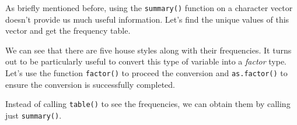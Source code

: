 \documentclass[
]{book}
\newenvironment{Shaded}{\begin{snugshade}}{\end{snugshade}}
\newcommand{\CommentTok}[1]{\textcolor[rgb]{0.56,0.35,0.01}{\textit{#1}}}
\newcommand{\FunctionTok}[1]{\textcolor[rgb]{0.00,0.00,0.00}{#1}}
\newcommand{\NormalTok}[1]{#1}
\newcommand{\OtherTok}[1]{\textcolor[rgb]{0.56,0.35,0.01}{#1}}
\newcommand{\SpecialCharTok}[1]{\textcolor[rgb]{0.00,0.00,0.00}{#1}}
\begin{document}
\begin{Shaded}
\end{Shaded}

As briefly mentioned before, using the \texttt{summary()} function on a character vector doesn't provide us much useful information. Let's find the unique values of this vector and get the frequency table.

\begin{Shaded}
\end{Shaded}

We can see that there are five house styles along with their frequencies. It turns out to be particularly useful to convert this type of variable into a \emph{factor} type. Let's use the function \texttt{factor()} to proceed the conversion and \texttt{as.factor()} to ensure the conversion is successfully completed.

\begin{Shaded}
\end{Shaded}

Instead of calling \texttt{table()} to see the frequencies, we can obtain them by calling just \texttt{summary()}.
\end{document}
